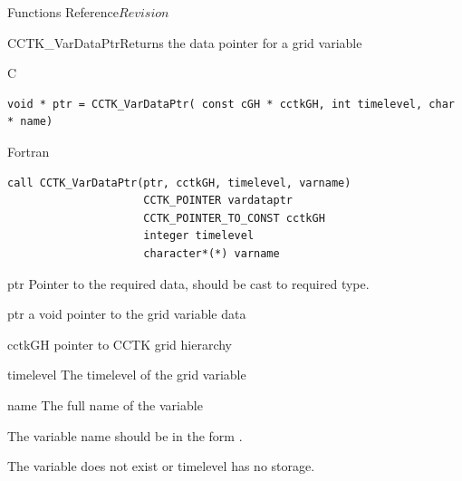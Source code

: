 \begin{cactuspart}{ Functions Reference}{}{$Revision$}



\begin{FunctionDescription}{CCTK\_VarDataPtr}{Returns the data pointer for a grid variable}
\label{CCTK-VarDataPtr}
\begin{SynopsisSection}
\begin{Synopsis}{C}
\begin{verbatim}void * ptr = CCTK_VarDataPtr( const cGH * cctkGH, int timelevel, char * name)\end{verbatim}
\end{Synopsis}
\begin{Synopsis}{Fortran}
\begin{verbatim}
call CCTK_VarDataPtr(ptr, cctkGH, timelevel, varname)
                     CCTK_POINTER vardataptr
                     CCTK_POINTER_TO_CONST cctkGH
                     integer timelevel
                     character*(*) varname
\end{verbatim}
\end{Synopsis}
\end{SynopsisSection}
\begin{ResultSection}
\begin{Result}{ptr}
Pointer to the required data, should be cast to required type.
\end{Result}
\end{ResultSection}
\begin{ParameterSection}
\begin{Parameter}{ptr}
a void pointer to the grid variable data
\end{Parameter}
\begin{Parameter}{cctkGH}
pointer to CCTK grid hierarchy
\end{Parameter}
\begin{Parameter}{timelevel}
The timelevel of the grid variable
\end{Parameter}
\begin{Parameter}{name}
The full name of the variable
\end{Parameter}
\end{ParameterSection}
\begin{Discussion}
The variable name should be in the form .
\end{Discussion}
\begin{ErrorSection}
\begin{Error}{}
The variable does not exist or timelevel has no storage.

\end{Error}
\end{ErrorSection}
\end{FunctionDescription}
\end{cactuspart}
